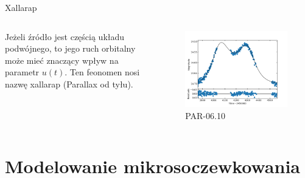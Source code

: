 \documentclass{beamer}
\begin{document}
\begin{frame}{Xallarap}
    \begin{columns}
        \begin{column}{0.5\linewidth}
            Jeżeli źródło jest częścią układu podwójnego, to jego ruch orbitalny może mieć znaczący wpływ na parametr $u(t)$.
            Ten feonomen nosi nazwę xallarap (Parallax od tyłu).
        \end{column}
        \begin{column}{0.5\linewidth}
            \begin{figure}
                \centering
                \includegraphics[width = \textwidth]{../sim30/xallarap/png/PAR-06-noaver.dat.10.png}
                \caption*{\tiny{PAR-06.10}}
            \end{figure}
        \end{column}
    \end{columns}
\end{frame}

\section{Modelowanie mikrosoczewkowania}
\end{document}
